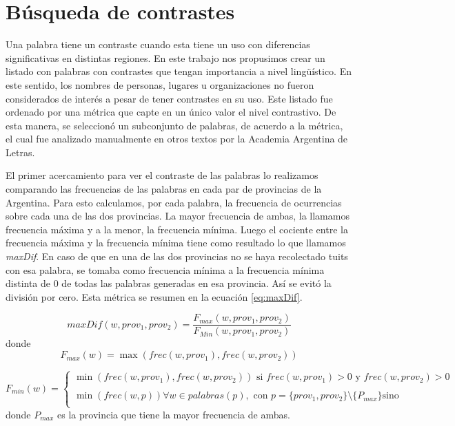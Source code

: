 \section{Búsqueda de contrastes}

Una palabra tiene un contraste cuando esta tiene un uso con diferencias significativas en
distintas regiones. En este trabajo nos propusimos crear un listado con palabras con contrastes que tengan
importancia a nivel lingüístico. En este sentido, los nombres de personas, lugares u organizaciones no 
fueron considerados de interés a pesar de tener contrastes en su uso.
Este listado fue ordenado por una métrica que capte en un único valor el nivel contrastivo. De esta manera, 
se seleccionó un subconjunto de palabras, de acuerdo a la métrica, el cual fue analizado manualmente en otros textos por la Academia Argentina de Letras.

El primer acercamiento para ver el contraste de las palabras lo realizamos comparando las frecuencias de las palabras 
en cada par de provincias de la Argentina. Para esto calculamos, por cada palabra, la frecuencia de ocurrencias sobre cada una de las dos provincias. La mayor frecuencia de ambas, la llamamos frecuencia máxima y a la menor, la frecuencia mínima. Luego el cociente entre la frecuencia máxima y la frecuencia mínima tiene como resultado lo que llamamos \textit{maxDif}. En caso de que en una de las dos provincias no se haya 
recolectado tuits con esa palabra, se tomaba como frecuencia mínima a la frecuencia mínima distinta de 0 de todas las palabras generadas en esa provincia. Así se evitó la división por cero. Esta métrica se resumen en la ecuación \ref{eq:maxDif}.


\begin{equation}
  \label{eq:maxDif} 
  maxDif(w,prov_1,prov_2) = \frac{F_{max}(w,prov_1,prov_2)}{F_{Min}(w,prov_1,prov_2)}
\end{equation}
donde 
\begin{equation}
F_{max}(w) = \max(frec(w,prov_1),frec(w,prov_2))
\end{equation}

\begin{equation}
 F_{min}(w) = \left\{ \begin{array}{ll}
             \min(frec(w,prov_1),frec(w,prov_2))  \text{ si } frec(w,prov_1) > 0 \text{ y } frec(w,prov_2) > 0 & \\
             \\\min(frec(w,p)) \forall w \in palabras(p) , \text{ con } p=\{prov_1,prov_2\} \setminus \{P_{max}\} \text{sino} &  \\
             \end{array}
   \right.
\end{equation}
   donde $P_{max}$ es la provincia que tiene la mayor frecuencia de ambas.\\



